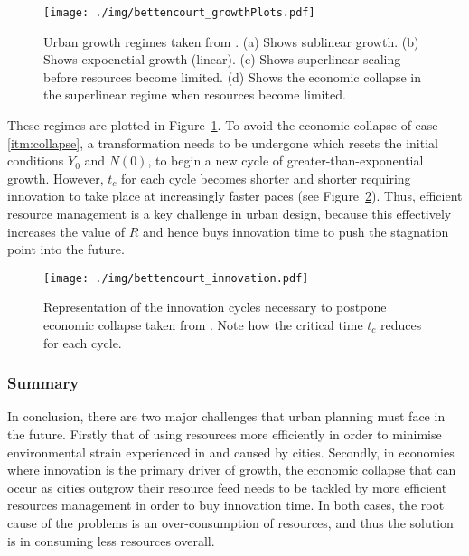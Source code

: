 \begin{figure}
	\centering
	\texttt{[image: ./img/bettencourt\_growthPlots.pdf]} 
	\caption{Urban growth regimes taken from \citet{Bettencourt2007}. (a) Shows sublinear growth. (b) Shows expoenetial growth (linear). (c) Shows superlinear scaling before resources become limited. (d) Shows the economic collapse in the superlinear regime when resources become limited.} \label{fig:bettencourt_growth}
\end{figure}
These regimes are plotted in Figure~\ref{fig:bettencourt_growth}. To avoid the economic collapse of case \eqref{itm:collapse}, a transformation needs to be undergone which resets the initial conditions $Y_0$ and $N(0)$, to begin a new cycle of greater-than-exponential growth. However, $t_c$ for each cycle becomes shorter and shorter requiring innovation to take place at increasingly faster paces (see Figure~\ref{fig:bettencourt_innovation}). Thus, efficient resource management is a key challenge in urban design, because this effectively increases the value of $R$ and hence buys innovation time to push the stagnation point into the future.

\begin{figure}
	\centering
	\texttt{[image: ./img/bettencourt\_innovation.pdf]} 
	\caption{Representation of the innovation cycles necessary to postpone economic collapse taken from \citet{Bettencourt2007}. Note how the critical time $t_c$ reduces for each cycle.} \label{fig:bettencourt_innovation}
\end{figure}

\subsubsection*{Summary}
In conclusion, there are two major challenges that urban planning must face in the future. Firstly that of using resources more efficiently in order to minimise environmental strain experienced in and caused by cities. Secondly, in economies where innovation is the primary driver of growth, the economic collapse that can occur as cities outgrow their resource feed needs to be tackled by more efficient resources management in order to buy innovation time. In both cases, the root cause of the problems is an over-consumption of resources, and thus the solution is in consuming less resources overall.


